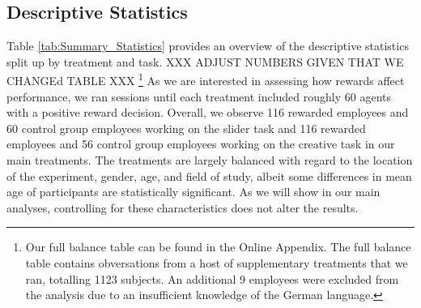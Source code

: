 
\subsection{Descriptive Statistics}\label{chap:descriptives}


Table \ref{tab:Summary_Statistics} provides an overview of the descriptive statistics split up by treatment and task. XXX ADJUST NUMBERS GIVEN THAT WE CHANGEd TABLE XXX \footnote{Our full balance table can be found in the Online Appendix. The full balance table contains obversations from a host of supplementary treatments that we ran, totalling 1123 subjects.   An additional 9 employees were excluded from the analysis 
due to an insufficient knowledge of the German
 language.}  As we are interested in assessing how rewards affect performance, 
we ran sessions until each treatment included roughly 60 agents with a positive 
reward decision.
Overall, we observe 116 rewarded employees and  60 control group employees working on the slider task 
and 116 rewarded employees and 56 control group employees working on the creative task in our main treatments. 
The treatments are largely balanced with regard to the location of the experiment, 
gender, age, and field of study, albeit some differences in mean age of participants are statistically 
significant.
As we will show in our main analyses, controlling for these characteristics does not alter the results. 


